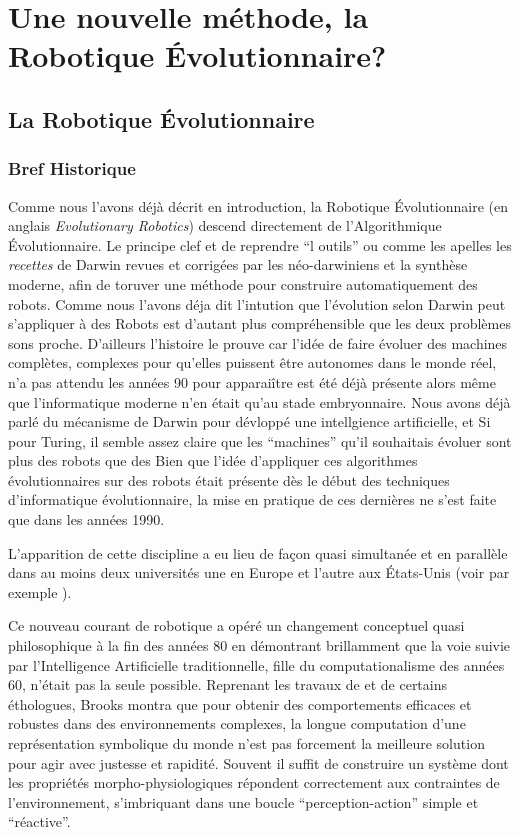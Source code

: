 \section{Une nouvelle méthode, la Robotique Évolutionnaire?}\label{sec:RE}
\subsection{La Robotique Évolutionnaire}
\subsubsection{Bref Historique}

Comme nous l'avons déjà décrit en introduction, la Robotique Évolutionnaire (en anglais \emph{Evolutionary Robotics}) descend directement de l'Algorithmique Évolutionnaire. Le principe clef et de reprendre ``l outils'' ou comme les apelles \cite{godfrey2009darwinian} les \emph{recettes} de Darwin revues et corrigées par les néo-darwiniens et la synthèse moderne, afin de toruver une méthode pour construire automatiquement des robots.
Comme nous l'avons déja dit l'intution que l'évolution selon Darwin peut s'appliquer à des Robots est d'autant plus compréhensible que les deux problèmes sons proche. D'ailleurs l'histoire le prouve car l'idée de faire évoluer des machines complètes, complexes pour qu'elles puissent être autonomes dans le monde réel, n'a pas attendu les années 90 pour apparaiître est été déjà présente alors même que l'informatique moderne n'en était qu'au stade embryonnaire. Nous avons déjà parlé du mécanisme de Darwin pour dévloppé une intellgience artificielle, et 
Si pour Turing, il semble assez claire que les ``machines'' qu'il souhaitais évoluer sont plus des robots que des Bien que l'idée d'appliquer ces algorithmes évolutionnaires sur des robots était présente dès le début des techniques d'informatique évolutionnaire, la mise en pratique de ces dernières ne s'est faite que dans les années 1990. 

L'apparition de cette discipline a eu lieu de fa\c{c}on quasi simultanée et en parallèle dans au moins deux universités une en Europe et l'autre aux États-Unis (voir par exemple \citet{harvey97evolutionaryroboticssussexapproach}). 

Ce nouveau courant de robotique a opéré un changement conceptuel quasi philosophique à la fin des années 80 en démontrant brillamment que la voie suivie par l'Intelligence Artificielle traditionnelle, fille du computationalisme des années 60, n'était pas la seule possible. Reprenant les travaux de \citet{braintenberg86vehicles} et de certains éthologues, Brooks montra que pour obtenir des comportements efficaces et robustes dans des environnements complexes, la longue computation d'une représentation symbolique du monde n'est pas forcement la meilleure solution pour agir avec justesse et rapidité. Souvent il suffit de construire un système dont les propriétés morpho-physiologiques répondent correctement aux contraintes de l'environnement, s'imbriquant dans une boucle ``perception-action'' simple et ``réactive''.

